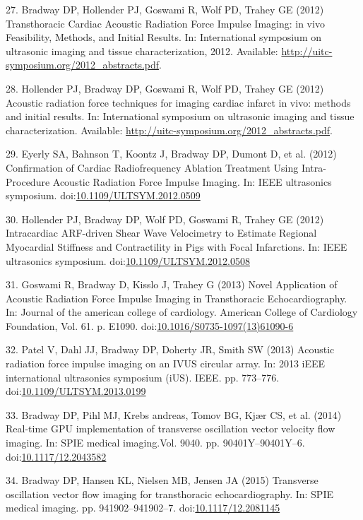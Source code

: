 \documentclass[letterpaper,10pt,english]{sphinxmanual}
\begin{document}
27. Bradway DP, Hollender PJ, Goswami R, Wolf PD, Trahey GE (2012)
Transthoracic Cardiac Acoustic Radiation Force Impulse Imaging: in vivo
Feasibility, Methods, and Initial Results. In: International symposium
on ultrasonic imaging and tissue characterization, 2012. Available:
\href{http://uitc-symposium.org/2012\_abstracts.pdf}{http://uitc-symposium.org/2012\_abstracts.pdf}.

28. Hollender PJ, Bradway DP, Goswami R, Wolf PD, Trahey GE (2012)
Acoustic radiation force techniques for imaging cardiac infarct in vivo:
methods and initial results. In: International symposium on ultrasonic
imaging and tissue characterization. Available:
\href{http://uitc-symposium.org/2012\_abstracts.pdf}{http://uitc-symposium.org/2012\_abstracts.pdf}.

29. Eyerly SA, Bahnson T, Koontz J, Bradway DP, Dumont D, et al. (2012)
Confirmation of Cardiac Radiofrequency Ablation Treatment Using
Intra-Procedure Acoustic Radiation Force Impulse Imaging. In: IEEE
ultrasonics symposium.
doi:\href{http://dx.doi.org/10.1109/ULTSYM.2012.0509}{10.1109/ULTSYM.2012.0509}

30. Hollender PJ, Bradway DP, Wolf PD, Goswami R, Trahey GE (2012)
Intracardiac ARF-driven Shear Wave Velocimetry to Estimate Regional
Myocardial Stiffness and Contractility in Pigs with Focal Infarctions.
In: IEEE ultrasonics symposium.
doi:\href{http://dx.doi.org/10.1109/ULTSYM.2012.0508}{10.1109/ULTSYM.2012.0508}

31. Goswami R, Bradway D, Kisslo J, Trahey G (2013) Novel Application of
Acoustic Radiation Force Impulse Imaging in Transthoracic
Echocardiography. In: Journal of the american college of cardiology.
American College of Cardiology Foundation, Vol. 61. p. E1090.
doi:\href{http://dx.doi.org/10.1016/S0735-1097(13)61090-6}{10.1016/S0735-1097(13)61090-6}

32. Patel V, Dahl JJ, Bradway DP, Doherty JR, Smith SW (2013) Acoustic
radiation force impulse imaging on an IVUS circular array. In: 2013 iEEE
international ultrasonics symposium (iUS). IEEE. pp. 773–776.
doi:\href{http://dx.doi.org/10.1109/ULTSYM.2013.0199}{10.1109/ULTSYM.2013.0199}

33. Bradway DP, Pihl MJ, Krebs andreas, Tomov BG, Kjær CS, et al. (2014)
Real-time GPU implementation of transverse oscillation vector velocity
flow imaging. In: SPIE medical imaging.Vol. 9040. pp. 90401Y–90401Y–6.
doi:\href{http://dx.doi.org/10.1117/12.2043582}{10.1117/12.2043582}

34. Bradway DP, Hansen KL, Nielsen MB, Jensen JA (2015) Transverse
oscillation vector flow imaging for transthoracic echocardiography. In:
SPIE medical imaging. pp. 941902–941902–7.
doi:\href{http://dx.doi.org/10.1117/12.2081145}{10.1117/12.2081145}



\renewcommand{\indexname}{Index}
\printindex
\end{document}
